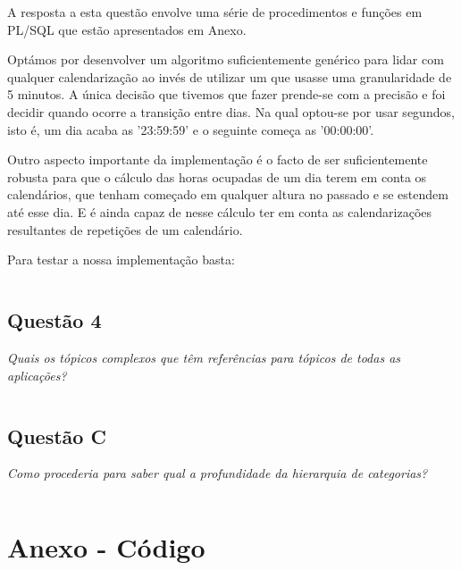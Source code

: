 \documentclass[a4paper,12pt]{article}
\begin{document}
	A resposta a esta questão envolve uma série de procedimentos e funções em PL/SQL que estão apresentados em Anexo.

	Optámos por desenvolver um algoritmo suficientemente genérico para lidar com qualquer calendarização ao invés de utilizar um que usasse uma granularidade de 5 minutos. A única decisão que tivemos que fazer prende-se com a precisão e foi decidir quando ocorre a transição entre dias. Na qual optou-se por usar segundos, isto é, um dia acaba as '23:59:59' e o seguinte começa as '00:00:00'.

	Outro aspecto importante da implementação é o facto de ser suficientemente robusta para que o cálculo das horas ocupadas de um dia terem em conta os calendários, que tenham começado em qualquer altura no passado e se estendem até esse dia. E é ainda capaz de nesse cálculo ter em conta as calendarizações resultantes de repetições de um calendário.

	Para testar a nossa implementação basta:
	
	\inputminted{sql}{3.sql}

\subsection{Questão 4}

	\emph{Quais os tópicos complexos que têm referências para tópicos de todas as aplicações?}\\

	\inputminted{sql}{4.sql}

\subsection{Questão C}

	\emph{Como procederia para saber qual a profundidade da hierarquia de categorias?}\\

	\inputminted{sql}{C.sql}


\newpage 
\section{Anexo - Código}


	\inputminted{sql}{sql3.sql}
\end{document}
